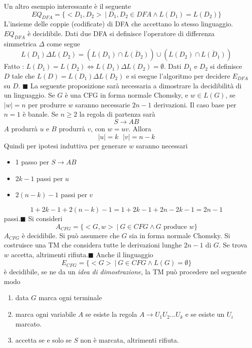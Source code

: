 \documentclass[10pt, letterpaper]{report}
\begin{document}
Un altro esempio interessante è il seguente 
$$ EQ_{DFA}=\{<D_1,D_2>\ | \ D_1,D_2\in DFA\land L(D_1)=L(D_2)\}$$
L'insieme delle coppie (codificate) di DFA che accettano lo stesso linguaggio.\acc 
\prop{} $EQ_{DFA}$ è decidibile. \acc 
\dimo{} Dati due DFA si definisce l'operatore di  differenza simmetrica $\Delta$ come segue 
$$ L(D_1)\Delta L(D_2)= (L(D_1)\cap \overline{L(D_2)})\cup (L(D_2)\cap \overline{L(D_1)})$$
Fatto : $L(D_1)=L(D_2)\iff L(D_1)\Delta L(D_2)=\emptyset$. Dati $D_1$ e $D_2$ si definisce $D$ tale che 
$L(D)=L(D_1)\Delta L(D_2)$ e si esegue l'algoritmo per decidere $E_{DFA}$ su $D$. \hfill$\blacksquare$\acc 
La seguente proposizione sarà necessaria a dimostrare la decidibilità di un linguaggio. \acc 
\prop{} Se $G$ è una CFG in forma normale Chomsky, e $w\in L(G)$, se $|w|=n$ per produrre $w$ saranno necessarie $2n-1$ derivazioni. \acc 
\dimo{} Il caso base per $n=1$ è banale. Se $n\ge 2$ la regola di partenza sarà $$ S\rightarrow AB$$ 
$A$ produrrà $u$ e $B$ produrrà $v$, con $w=uv$. Allora 
$$ |u|= k \ \ \ |v|=n-k$$
Quindi per ipotesi induttiva per generare $w$ saranno necessari \begin{itemize}
    \item 1 passo per $S\rightarrow AB$
    \item $2k-1$ passi per $u$
    \item $2(n-k)-1$ passi per $v$
\end{itemize}
$$ 1+2k-1+2(n-k)-1=1+2k-1+2n-2k-1=2n-1$$
passi.\hfill$\blacksquare$\acc 
Si consideri 
$$ A_{CFG}=\{<G,w>\ |\ G\in CFG \land G \text{ produce }w\}$$
\prop{} $A_{CFG}$ è decidibile. \acc 
\dimo{} Si può assumere che $G$ sia in forma normale Chomsky. Si costruisce una TM che considera tutte le derivazioni lunghe $2n-1$ di $G$. Se trova $w$ accetta, altrimenti rifiuta.\hfill$\blacksquare$\acc 
Anche il linguaggio 
$$ E_{CFG}=\{<G>\ | \ G\in CFG \land L(G)=\emptyset\}$$
è decidibile, se ne da un \textit{idea di dimostrazione}, la TM può procedere nel seguente modo\begin{enumerate}
    \item data $G$ marca ogni terminale 
    \item marca ogni variabile $A$ se esiste la regola $A\longrightarrow U_1U_2\dots U_k$
    e se esiste un $U_i$ marcato. 
    \item accetta se e solo se $S$ non è marcata, altrimenti rifiuta.
\end{enumerate}
\flowerLine 
\end{document}
